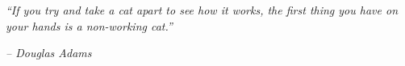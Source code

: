 \clearpage
{}

\begin{center}
\vspace*{11cm}
\textit{``If you try and take a cat apart to see how it works, the first thing you have on your hands is a non-working cat.''}
\end{center}
\par
\hspace*{7cm}
\textit{-- Douglas Adams}